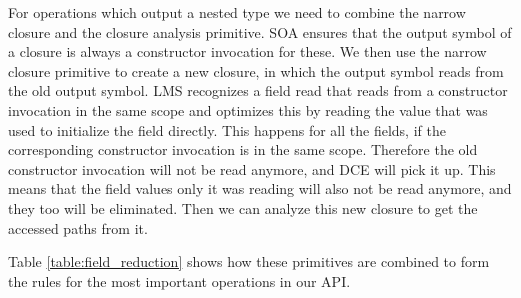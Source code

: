 For  operations which output a nested type we need to combine the narrow closure and the closure analysis primitive. SOA ensures that the output symbol of a closure is always a constructor invocation for these. We then use the narrow closure primitive to create a new closure, in which the output symbol reads from the old output symbol. LMS recognizes a field read that reads from a constructor invocation in the same scope and optimizes this by reading the value that was used to initialize the field directly. This happens for all the fields, if the corresponding constructor invocation is in the same scope. Therefore the old constructor invocation will not be read anymore, and DCE will pick it up. This means that the field values only it was reading will also not be read anymore, and they too will be eliminated. Then we can analyze this new closure to get the accessed paths from it. 


Table \ref{table:field_reduction} shows how these primitives are combined to form the rules for the most important operations in our API.

 
